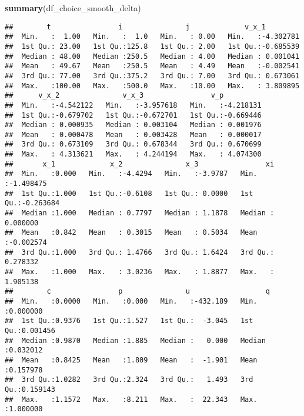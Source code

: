 \documentclass[
]{book}
\newenvironment{Shaded}{\begin{snugshade}}{\end{snugshade}}
\newcommand{\KeywordTok}[1]{\textcolor[rgb]{0.13,0.29,0.53}{\textbf{#1}}}
\newcommand{\NormalTok}[1]{#1}
\newcommand{\OperatorTok}[1]{\textcolor[rgb]{0.81,0.36,0.00}{\textbf{#1}}}
\newcommand{\StringTok}[1]{\textcolor[rgb]{0.31,0.60,0.02}{#1}}
\begin{document}
\begin{Shaded}
\begin{Highlighting}[]
\KeywordTok{summary}\NormalTok{(df_choice_smooth_delta)}
\end{Highlighting}
\end{Shaded}

\begin{verbatim}
##        t                i               j             v_x_1          
##  Min.   :  1.00   Min.   :  1.0   Min.   : 0.00   Min.   :-4.302781  
##  1st Qu.: 23.00   1st Qu.:125.8   1st Qu.: 2.00   1st Qu.:-0.685539  
##  Median : 48.00   Median :250.5   Median : 4.00   Median : 0.001041  
##  Mean   : 49.67   Mean   :250.5   Mean   : 4.49   Mean   :-0.002541  
##  3rd Qu.: 77.00   3rd Qu.:375.2   3rd Qu.: 7.00   3rd Qu.: 0.673061  
##  Max.   :100.00   Max.   :500.0   Max.   :10.00   Max.   : 3.809895  
##      v_x_2               v_x_3                v_p           
##  Min.   :-4.542122   Min.   :-3.957618   Min.   :-4.218131  
##  1st Qu.:-0.679702   1st Qu.:-0.672701   1st Qu.:-0.669446  
##  Median : 0.000935   Median : 0.003104   Median : 0.001976  
##  Mean   : 0.000478   Mean   : 0.003428   Mean   : 0.000017  
##  3rd Qu.: 0.673109   3rd Qu.: 0.678344   3rd Qu.: 0.670699  
##  Max.   : 4.313621   Max.   : 4.244194   Max.   : 4.074300  
##       x_1             x_2               x_3                xi           
##  Min.   :0.000   Min.   :-4.4294   Min.   :-3.9787   Min.   :-1.498475  
##  1st Qu.:1.000   1st Qu.:-0.6108   1st Qu.: 0.0000   1st Qu.:-0.263684  
##  Median :1.000   Median : 0.7797   Median : 1.1878   Median : 0.000000  
##  Mean   :0.842   Mean   : 0.3015   Mean   : 0.5034   Mean   :-0.002574  
##  3rd Qu.:1.000   3rd Qu.: 1.4766   3rd Qu.: 1.6424   3rd Qu.: 0.278332  
##  Max.   :1.000   Max.   : 3.0236   Max.   : 1.8877   Max.   : 1.905138  
##        c                p               u                  q           
##  Min.   :0.0000   Min.   :0.000   Min.   :-432.189   Min.   :0.000000  
##  1st Qu.:0.9376   1st Qu.:1.527   1st Qu.:  -3.045   1st Qu.:0.001456  
##  Median :0.9870   Median :1.885   Median :   0.000   Median :0.032012  
##  Mean   :0.8425   Mean   :1.809   Mean   :  -1.901   Mean   :0.157978  
##  3rd Qu.:1.0282   3rd Qu.:2.324   3rd Qu.:   1.493   3rd Qu.:0.159143  
##  Max.   :1.1572   Max.   :8.211   Max.   :  22.343   Max.   :1.000000
\end{verbatim}

\begin{Shaded}
\end{Shaded}
\end{document}

